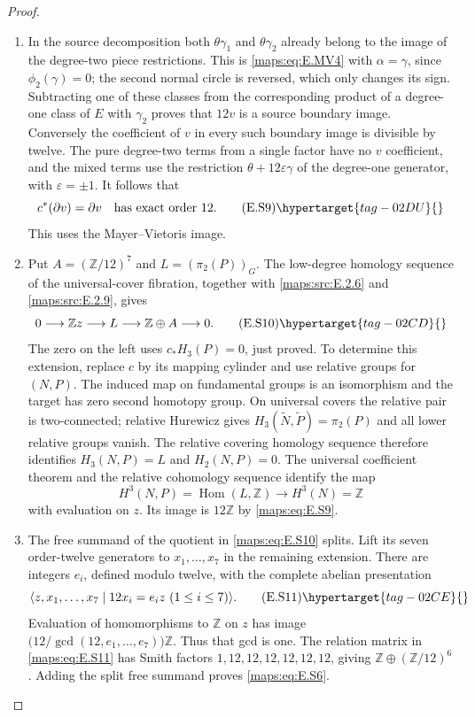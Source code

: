 \begin{proof}
\begin{enumerate}[label={$\langle1\rangle$\arabic*.},leftmargin=*]
\item In the source decomposition both $\theta\gamma_1$ and
$\theta\gamma_2$ already belong to the image of the degree-two
piece restrictions. This is \eqref{maps:eq:E.MV4} with $\alpha=\gamma$,
since $\phi_2(\gamma)=0$; the second normal circle is reversed,
which only changes its sign. Subtracting one of these classes
from the corresponding product of a degree-one class of $E$
with $\gamma_2$ proves that $12v$ is a source boundary image.
Conversely the coefficient of $v$ in every such boundary image
is divisible by twelve. The pure degree-two terms from a single
factor have no $v$ coefficient, and the mixed terms use the
restriction $\theta+12\varepsilon\gamma$ of the degree-one
generator, with $\varepsilon=\pm1$. It follows that
\[
                  c^*(\partial v)=\partial v
        \quad\text{has exact order }12.
 \tag{E.S9}\hypertarget{tag-02DU}{}\label{maps:eq:E.S9}
\]
This uses the Mayer--Vietoris image.

\item Put $A=(\mathbb Z/12)^7$ and $L=(\pi_2(P))_G$.
The low-degree homology sequence of the universal-cover
fibration, together with \ref{maps:src:E.2.6} and \ref{maps:src:E.2.9}, gives
\[
             0\longrightarrow\mathbb Z z\longrightarrow L
                \longrightarrow\mathbb Z\oplus A\longrightarrow0.
 \tag{E.S10}\hypertarget{tag-02CD}{}\label{maps:eq:E.S10}
\]
The zero on the left uses $c_*H_3(P)=0$, just proved.
To determine this extension, replace $c$ by its mapping cylinder
and use relative groups for $(N,P)$. The induced map on fundamental
groups is an isomorphism and the target has zero second homotopy
group. On universal covers the relative pair is two-connected;
relative Hurewicz gives
$H_3(\widetilde N,\widetilde P)=\pi_2(P)$ and all lower relative
groups vanish. The relative covering homology sequence therefore
identifies $H_3(N,P)=L$ and $H_2(N,P)=0$.
The universal coefficient theorem and the relative cohomology
sequence identify the map
\[
       H^3(N,P)=\operatorname{Hom}(L,\mathbb Z)
         \longrightarrow H^3(N)=\mathbb Z
\]
with evaluation on $z$. Its image is $12\mathbb Z$ by \eqref{maps:eq:E.S9}.

\item The free summand of the quotient in \eqref{maps:eq:E.S10} splits. Lift its
seven order-twelve generators to $x_1,\ldots,x_7$ in the
remaining extension. There are integers $e_i$, defined modulo
twelve, with the complete abelian presentation
\[
        \langle z,x_1,\ldots,x_7\mid
                      12x_i=e_i z\ (1\leq i\leq7)\rangle.
 \tag{E.S11}\hypertarget{tag-02CE}{}\label{maps:eq:E.S11}
\]
Evaluation of homomorphisms to $\mathbb Z$ on $z$ has image
$\bigl(12/\gcd(12,e_1,\ldots,e_7)\bigr)\mathbb Z$.
Thus that gcd is one. The relation matrix in \eqref{maps:eq:E.S11} has
Smith factors $1,12,12,12,12,12,12$, giving
$\mathbb Z\oplus(\mathbb Z/12)^6$. Adding the split free
summand proves \eqref{maps:eq:E.S6}.


\end{enumerate}
\end{proof}
